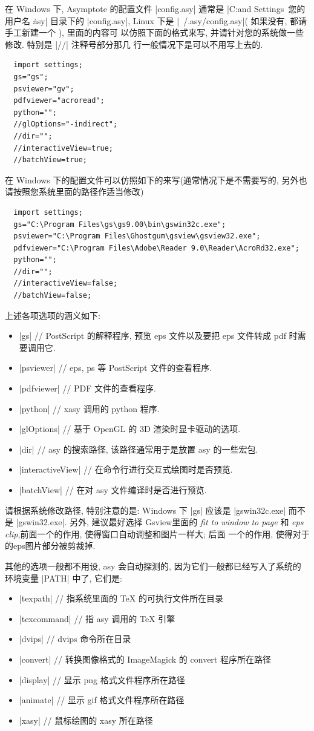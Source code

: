 \documentclass[nofonts,CJKnormalspaces]{ctexbook}
\begin{document}
在 Windows 下, Asymptote 的配置文件 |config.asy| 通常是
|C:\Documents and Settings\ 您的用户名 \.asy| 目录下的 |config.asy|,
Linux 下是 |~/.asy/config.asy|( 如果没有, 都请手工新建一个 ), 里面的内容可
以仿照下面的格式来写, 并请针对您的系统做一些修改. 特别是 |//| 注释号部分那几
行一般情况下是可以不用写上去的.
\begin{lstlisting}
  import settings;
  gs="gs";
  psviewer="gv";
  pdfviewer="acroread";
  python="";
  //glOptions="-indirect";
  //dir="";
  //interactiveView=true;
  //batchView=true;
\end{lstlisting}

在 Windows 下的配置文件可以仿照如下的来写(通常情况下是不需要写的,
另外也请按照您系统里面的路径作适当修改)

\begin{lstlisting}
  import settings;
  gs="C:\Program Files\gs\gs9.00\bin\gswin32c.exe";
  psviewer="C:\Program Files\Ghostgum\gsview\gsview32.exe";
  pdfviewer="C:\Program Files\Adobe\Reader 9.0\Reader\AcroRd32.exe";
  python="";
  //dir="";
  //interactiveView=false;
  //batchView=false;
\end{lstlisting}

上述各项选项的涵义如下:
\begin{itemize}
\item |gs| // PostScript 的解释程序, 预览 eps 文件以及要把 eps 文件转成 pdf
  时需要调用它.
\item |psviewer| //  eps, ps 等 PostScript 文件的查看程序.
\item |pdfviewer| // PDF 文件的查看程序.
\item |python| // xasy 调用的 python 程序.
\item |glOptions| // 基于 OpenGL 的 3D 渲染时显卡驱动的选项.
\item |dir|    // asy 的搜索路径, 该路径通常用于是放置 asy 的一些宏包.
\item |interactiveView| // 在命令行进行交互式绘图时是否预览.
\item |batchView| // 在对 asy 文件编译时是否进行预览.
\end{itemize}
请根据系统修改路径, 特别注意的是: Windows 下 |gs| 应该是 |gswin32c.exe| 而不是
|gswin32.exe|. 另外, 建议最好选择 Gsview里面的 \emph{fit to window to page}
和 \emph{eps clip},前面一个的作用, 使得窗口自动调整和图片一样大; 后面
一个的作用, 使得对于的eps图片部分被剪裁掉.

其他的选项一般都不用设, asy 会自动探测的, 因为它们一般都已经写入了系统的
环境变量 |PATH| 中了, 它们是:
\begin{itemize}
\item |texpath| // 指系统里面的 TeX 的可执行文件所在目录
\item |texcommand| // 指 asy 调用的 TeX 引擎
\item |dvips|  // dvips 命令所在目录
\item |convert| // 转换图像格式的 ImageMagick 的 convert 程序所在路径
\item |display| // 显示 png 格式文件程序所在路径
\item |animate| // 显示 gif 格式文件程序所在路径
\item |xasy| // 鼠标绘图的 xasy 所在路径
\end{itemize}
\end{document}
